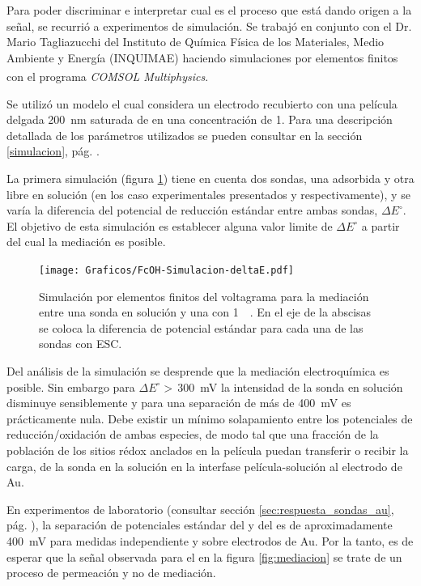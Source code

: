 		Para poder discriminar e interpretar cual es el proceso que está dando origen a la señal, se recurrió a experimentos de simulación. Se trabajó en conjunto con el Dr. Mario Tagliazucchi del Instituto de Química Física de los Materiales, Medio Ambiente y Energía (INQUIMAE) haciendo simulaciones por elementos finitos con el programa \textit{COMSOL Multiphysics\textsuperscript\textregistered}.

		Se utilizó un modelo el cual considera un electrodo recubierto con una película delgada \SI{200}{nm} saturada de  \aminorutenio en una concentración de \SI{1}{\Molar}. Para una descripción detallada de los parámetros utilizados se pueden consultar en la sección \ref{simulacion}, pág. \pageref{simulacion}. 

		La primera simulación (figura \ref{fig:sim_mediacion}) tiene en cuenta dos sondas, una adsorbida y otra libre en solución (en los caso experimentales presentados \ru\space y \fc\space respectivamente), y se varía la diferencia del potencial de reducción estándar entre ambas sondas, $\Delta E^\circ$. El objetivo de esta simulación es establecer alguna valor limite de $\Delta E^\circ$ a partir del cual la mediación es posible. 

			\begin{figure}[ht]
					\centering
			 	    \texttt{[image: Graficos/FcOH-Simulacion-deltaE.pdf]}
			        \vspace*{-2mm}
			        \caption[Simulación EQ de mediación redox]{Simulación por elementos finitos del voltagrama para la mediación entre una sonda en solución y una \pdmF\space con \ru\space \SI{1}{\milli\Molar}. En el eje de la abscisas se coloca la diferencia de potencial estándar para cada una de las sondas con ESC.}
			        \label{fig:sim_mediacion}
			      	\end{figure}

		Del análisis de la simulación se desprende que la mediación electroquímica es posible. Sin embargo para $\Delta E^\circ\!\!>\,$\SI{300}{\milli\volt} la intensidad de la sonda en solución disminuye sensiblemente y para una separación de más de \SI{400}{\milli\volt} es prácticamente nula. Debe existir un mínimo solapamiento entre los potenciales de reducción/oxidación de ambas especies, de modo tal que una fracción de la población de los sitios rédox anclados en la película puedan transferir o recibir la carga, de la sonda en la solución en la interfase película-solución al electrodo de Au.

		En experimentos de laboratorio (consultar sección \ref{sec:respuesta_sondas_au}, pág. \pageref{sec:respuesta_sondas_au}), la separación de potenciales estándar del \ru\space y del \fc\space es de aproximadamente \SI{400}{\milli\volt} para medidas independiente y sobre electrodos de Au. Por la tanto, es de esperar que la señal observada para el \fc\space en la figura \ref{fig:mediacion} se trate de un proceso de permeación y no de mediación.

